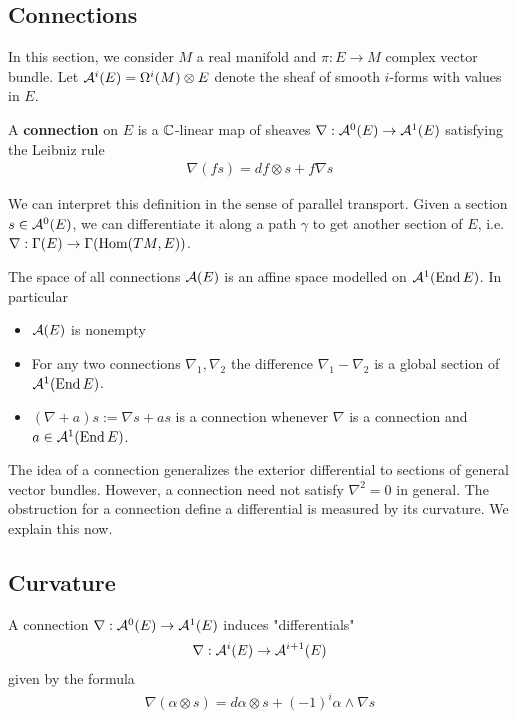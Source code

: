 \subsection{Connections}
In this section, we consider $M$ a real manifold and $\pi:E\to M$ complex vector bundle.
Let ${\mathcal{A}}^i(E) = \Omega^i(M) \otimes E$ denote the sheaf of smooth $i$-forms with values in $E$.
\begin{definition}
    A \textbf{connection} on $E$ 
    is a $\mathbb{C}$-linear map of sheaves
    $\nabla:{\mathcal{A}}^0(E)\to{\mathcal{A}}^1(E)$ satisfying the Leibniz rule
    \begin{align*}
        \nabla(fs) = df\otimes s + f\nabla s
    \end{align*}
\end{definition}
We can interpret this definition in the sense of parallel transport. Given 
a section $s\in{\mathcal{A}}^0(E)$, we can differentiate it along a path $\gamma$ to get another 
section of $E$, i.e. $\nabla:\Gamma(E)\to \Gamma(\operatorname{Hom}(TM,E))$.
\begin{theorem}
    The space of all connections ${\mathcal{A}}(E)$ is an affine space modelled on ${\mathcal{A}}^1(\operatorname{End} E)$. In particular \begin{itemize}
        \item ${\mathcal{A}}(E)$ is nonempty
        \item For any two connections $\nabla_1,\nabla_2$ the difference $\nabla_1-\nabla_2$ 
        is a global section of ${\mathcal{A}}^1(\operatorname{End} E)$.
        \item $(\nabla + a)s := \nabla s + as$ is a connection whenever $\nabla$ is a connection and 
        $a\in{\mathcal{A}}^1(\operatorname{End} E)$.
    \end{itemize}
\end{theorem}

The idea of a connection generalizes the exterior differential to sections of general vector bundles. 
However, a connection need not satisfy $\nabla^2 = 0$ in general. The obstruction for a connection
define a differential is measured by its curvature. We explain this now.

\subsection{Curvature}

A connection $\nabla:{\mathcal{A}}^0(E)\to {\mathcal{A}}^1(E)$ induces "differentials" \begin{align*}
    \nabla:{\mathcal{A}}^i(E)\to{\mathcal{A}}^{i+1}(E)
\end{align*} given by the formula \begin{align*}
    \nabla(\alpha\otimes s) = d\alpha\otimes s + (-1)^i\alpha\wedge\nabla s
\end{align*}

